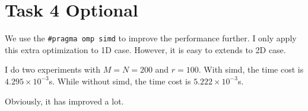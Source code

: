 \section{Task 4 Optional}

We use the \lstinline{#pragma omp simd} to improve the performance further.
I only apply this extra optimization to 1D case. However,
it is easy to extends to 2D case.

I do two experiments with $M=N=200$ and $r=100$.
With simd, the time cost is $4.295\times 10^{-3}$s. While without simd,
the time cost is $5.222\times 10^{-3}$s.

Obviously, it has improved a lot.


